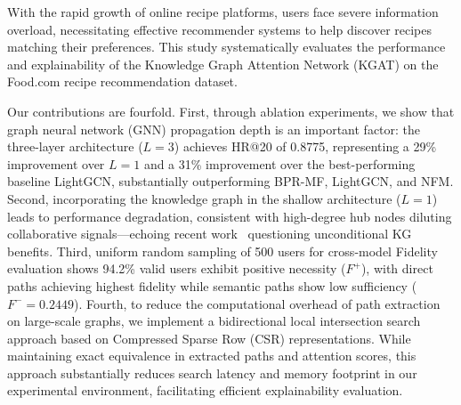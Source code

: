 
\begin{abstract}

隨著網路食譜平台的蓬勃發展，使用者面臨嚴重的資訊過載問題，亟需有效的推薦系統協助探索潛在偏好的食譜內容。本研究以知識圖注意力網路 (Knowledge Graph Attention Network, KGAT) 為核心，在 Food.com 食譜推薦資料集上進行系統性的效能評估與可解釋性研究。

本研究的主要貢獻包含四個面向。首先，透過消融實驗，顯示圖神經網路傳播深度是影響推薦效能的關鍵因素：三層架構 ($L{=}3$) 之 HR@20 達 0.8775，較單層架構提升逾 29\%，較表現最佳之基準模型 LightGCN 提升達 31\%，全面超越 BPR-MF、LightGCN 及 NFM。其次，發現在淺層架構 ($L{=}1$) 下，引入知識圖後觀察到效能下降，與「高連接度節點稀釋協同過濾訊號」之解釋相符，呼應近期文獻~\cite{zhang2024kg4receval}對知識圖效益之檢驗。第三，以均勻隨機抽樣抽選 500 位使用者進行跨模型 Fidelity 量化評估，證實 KGAT-3L 中 94.2\% 有效使用者具正向必要性 ($F^+$)，且直接連接路徑忠實度最高，而語意路徑充分性偏低 ($F^- = 0.2449$)。第四，針對大規模協同知識圖之路徑檢索開銷，本研究結合壓縮稀疏列（Compressed Sparse Row, CSR）表示法與雙向局部交集搜尋策略，在不改變輸出路徑集合與權重分數的前提下，於本實驗環境中明顯降低單次尋路延遲與記憶體佔用，提升可解釋路徑萃取之執行效率。

\end{abstract}

\begin{abstract*}

With the rapid growth of online recipe platforms, users face severe information overload, necessitating effective recommender systems to help discover recipes matching their preferences. This study systematically evaluates the performance and explainability of the Knowledge Graph Attention Network (KGAT) on the Food.com recipe recommendation dataset.

Our contributions are fourfold. First, through ablation experiments, we show that graph neural network (GNN) propagation depth is an important factor: the three-layer architecture ($L{=}3$) achieves HR@20 of 0.8775, representing a 29\% improvement over $L{=}1$ and a 31\% improvement over the best-performing baseline LightGCN, substantially outperforming BPR-MF, LightGCN, and NFM. Second, incorporating the knowledge graph in the shallow architecture ($L{=}1$) leads to performance degradation, consistent with high-degree hub nodes diluting collaborative signals---echoing recent work~\cite{zhang2024kg4receval} questioning unconditional KG benefits. Third, uniform random sampling of 500 users for cross-model Fidelity evaluation shows 94.2\% valid users exhibit positive necessity ($F^+$), with direct paths achieving highest fidelity while semantic paths show low sufficiency ($F^- = 0.2449$). Fourth, to reduce the computational overhead of path extraction on large-scale graphs, we implement a bidirectional local intersection search approach based on Compressed Sparse Row (CSR) representations. While maintaining exact equivalence in extracted paths and attention scores, this approach substantially reduces search latency and memory footprint in our experimental environment, facilitating efficient explainability evaluation.

\end{abstract*}